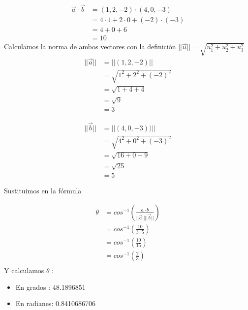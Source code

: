 \documentclass[12pt]{article}
\begin{document}
\begin{itemize}
  \begin{equation*}
  \begin{split}
   \vec{a} \cdot \vec{b}  &= (1, 2, -2) \cdot  (4, 0, -3)  \\
    &= 4 \cdot 1 + 2 \cdot 0 + (-2) \cdot (-3) \\
    &= 4 + 0 +6 \\
    &= 10 
  \end{split}
  \end{equation*}
  Calculamos la norma de ambos vectores con la definición $ ||\vec{u}|| = \sqrt{u_1^2 + u_2^2 + u_3^2} $
   \begin{equation*}
  \begin{split}
   ||\vec{a}||  &= ||(1, 2, -2)||  \\
    &= \sqrt{1^2 + 2^2 + (-2)^2} \\
    &= \sqrt{1 + 4 + 4} \\
   &= \sqrt{9} \\
   &=3
  \end{split}
   \end{equation*}

    \begin{equation*}
  \begin{split}
   ||\vec{b}||  &= ||(4, 0, -3))||  \\
    &= \sqrt{4^2 + 0^2 + (-3)^2} \\
    &= \sqrt{16 + 0 + 9} \\
   &= \sqrt{25} \\
   &= 5
  \end{split}
    \end{equation*}

Sustituimos en la fórmula
    
    \begin{equation*}
  \begin{split}
    \theta &= cos^{-1 }\left(\frac{a \cdot b}{||\vec{a}|| ||\vec{b}||}\right) \\
    &=  cos^{-1 }\left(\frac{10}{3 \cdot 5} \right) \\
    &= cos^{-1 }\left(\frac{10}{15} \right) \\
    &= cos^{-1 }\left(\frac{2}{3} \right) \\
  \end{split}
    \end{equation*}
Y  calculamos $\theta$ :
\begin{itemize}
\item En grados : 48.1896851
\item En radianes: 0.8410686706
\end{itemize}


\end{itemize}
\end{document}
